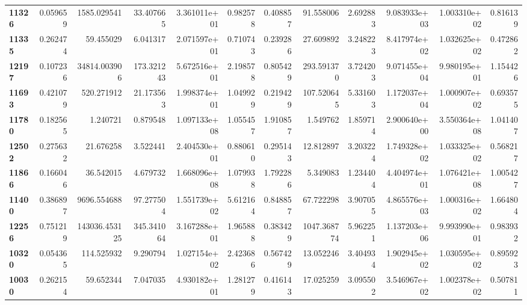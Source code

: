 \begin{table}[h]
\begin{tabular}{lrrrrrrrrrrr}
\textbf{11326} &  0.059659 &    1585.029541 &       33.407665 &               3.361011e+01 &  0.982578 &  0.408857 &    91.558006 &   2.692883 &  9.083933e+03 &  1.003310e+02 &     0.816139 \\
\textbf{11335} &  0.262474 &      59.455029 &        6.041317 &               2.071597e+01 &  0.710743 &  0.239286 &    27.609892 &   3.248223 &  8.417974e+02 &  1.032625e+02 &     0.472862 \\
\textbf{12197} &  0.107236 &   34814.003906 &      173.321243 &               5.672516e+01 &  2.198578 &  0.805429 &   293.591370 &   3.724203 &  9.071455e+04 &  9.980195e+01 &     1.154426 \\
\textbf{11693} &  0.421079 &     520.271912 &       21.173563 &               1.998374e+01 &  1.049929 &  0.219429 &   107.520645 &   5.331603 &  1.172037e+04 &  1.000907e+02 &     0.693575 \\
\textbf{11780} &  0.182565 &       1.240721 &        0.879548 &               1.097133e+08 &  1.055457 &  1.910857 &     1.549762 &   1.859714 &  2.900640e+00 &  3.550364e+08 &     1.041407 \\
\textbf{12502} &  0.275632 &      21.676258 &        3.522441 &               2.404530e+01 &  0.880610 &  0.295143 &    12.812897 &   3.203224 &  1.749328e+02 &  1.033325e+02 &     0.568217 \\
\textbf{11866} &  0.166046 &      36.542015 &        4.679732 &               1.668096e+08 &  1.079938 &  1.792286 &     5.349083 &   1.234404 &  4.404974e+01 &  1.076421e+08 &     1.005427 \\
\textbf{11400} &  0.386897 &    9696.554688 &       97.277504 &               1.551739e+02 &  5.612164 &  0.848857 &    67.722298 &   3.907055 &  4.865576e+03 &  1.000316e+02 &     1.664804 \\
\textbf{12256} &  0.751219 &  143036.453125 &      345.341064 &               3.167288e+01 &  1.965888 &  0.383429 &  1047.368774 &   5.962251 &  1.137203e+06 &  9.993990e+01 &     0.983932 \\
\textbf{10320} &  0.054365 &     114.525932 &        9.290794 &               1.027154e+02 &  2.423686 &  0.567429 &    13.052246 &   3.404934 &  1.902945e+02 &  1.030595e+02 &     0.895923 \\
\textbf{10030} &  0.262154 &      59.652344 &        7.047035 &               4.930182e+01 &  1.281279 &  0.416143 &    17.025259 &   3.095502 &  3.546967e+02 &  1.002378e+02 &     0.507811 \\
\bottomrule
\end{tabular}
\end{table}
